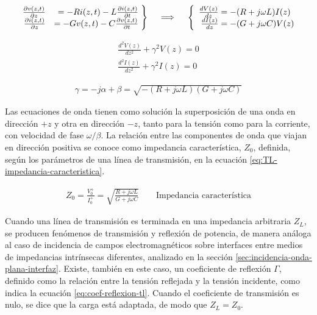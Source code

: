 \begin{align}
	\label{eq:Telegrafista}
	\left. \begin{array}{rr@{\mskip\thickmuskip}l}
	\frac{\partial v(z,t)}{\partial z} & = -R i(z,t) - L \frac{\partial i(z,t)}{\partial t}\\
	\frac{\partial i(z,t)}{\partial z} & = -G v(z,t) - C \frac{\partial v(z,t)}{\partial t}
	\end{array}\right\} \quad \implies \quad \left\{\begin{array}{r@{\mskip\thickmuskip}l}
	\frac{dV(z)}{dz} & = -(R+j\omega L)I(z) \\
	\frac{dI(z)}{dz} & = -(G+j\omega C)V(z) 
	\end{array}\right.
\end{align}


\begin{equation}
\begin{aligned}
	\frac{d^2 V(z)}{dz^2} + \gamma^2 V(z) = 0 \\
	\frac{d^2 I(z)}{dz^2} + \gamma^2 I(z) = 0
\end{aligned}
\label{eq:ec-onda-TL}
\end{equation}

\begin{align}
	\label{eq:gamma-tl}
	\gamma = -j\alpha + \beta = \sqrt{-(R+j\omega L)(G+j\omega C)}	
\end{align}

 Las ecuaciones de onda tienen como solución la superposición de una onda en dirección $+z$ y otra en dirección $-z$, tanto para la tensión como para la corriente, con velocidad de fase $\omega/\beta$. La relación entre las componentes de onda que viajan en dirección positiva se conoce como impedancia característica, $Z_0$, definida, según los parámetros de una línea de transmisión, en la ecuación \ref{eq:TL-impedancia-caracteristica}.
 
\begin{align}
	\label{eq:TL-impedancia-caracteristica}
	Z_0 = \frac{V_0^+}{I_0^+} = \sqrt{\frac{R+j\omega L}{G+j\omega C}} \qquad \text{Impedancia característica}
\end{align}

Cuando una línea de transmisión es terminada en una impedancia arbitraria $Z_L$, se producen fenómenos de transmisión y reflexión de potencia, de manera análoga al caso de incidencia de campos electromagnéticos sobre interfaces entre medios de impedancias intrínsecas diferentes, analizado en la sección \ref{sec:incidencia-onda-plana-interfaz}. Existe, también en este caso, un coeficiente de reflexión $\Gamma$, definido como la relación entre la tensión reflejada y la tensión incidente, como indica la ecuación \ref{eq:coef-reflexion-tl}. Cuando el coeficiente de transmisión es nulo, se dice que la carga está adaptada, de modo que $Z_L = Z_0$.

